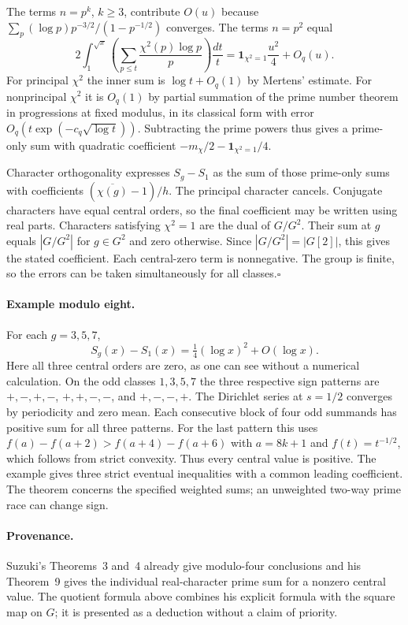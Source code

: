 The terms $n=p^k$, $k\ge3$, contribute $O(u)$ because
$\sum_p (\log p)p^{-3/2}/(1-p^{-1/2})$ converges. The terms $n=p^2$ equal
\[
 2\int_1^{\sqrt x}
        \left(\sum_{p\le t}\frac{\chi^2(p)\log p}{p}\right)\frac{dt}{t}
 =\mathbf 1_{\chi^2=1}\frac{u^2}{4}+O_q(u).
\]
For principal $\chi^2$ the inner sum is $\log t+O_q(1)$ by Mertens'
estimate. For nonprincipal $\chi^2$ it is $O_q(1)$ by partial summation
of the prime number theorem in progressions at fixed modulus, in its
classical form with error $O_q(t\exp(-c_q\sqrt{\log t}))$.
Subtracting the prime powers thus gives a prime-only sum with quadratic
coefficient $-m_\chi/2-\mathbf 1_{\chi^2=1}/4$.

Character orthogonality expresses $S_g-S_1$ as the sum of those
prime-only sums with coefficients $(\overline{\chi(g)}-1)/h$. The principal
character cancels. Conjugate characters have equal central orders, so the
final coefficient may be written using real parts. Characters satisfying
$\chi^2=1$ are the dual of $G/G^2$. Their sum at $g$ equals
$|G/G^2|$ for $g\in G^2$ and zero otherwise. Since
$|G/G^2|=|G[2]|$, this gives the stated coefficient. Each central-zero
term is nonnegative. The group is finite, so the errors can be taken
simultaneously for all classes.\hfill$\square$

\paragraph{Example modulo eight.}
For each $g=3,5,7$,
\[
  S_g(x)-S_1(x)=\tfrac14(\log x)^2+O(\log x).
\]
Here all three central orders are zero, as one can see without a
numerical calculation. On the odd classes $1,3,5,7$ the three respective
sign patterns are $+,-,+,-$, $+,+,-,-$, and $+,-,-,+$.
The Dirichlet series at $s=1/2$ converges by periodicity and zero mean.
Each consecutive block of four odd summands has positive sum for all
three patterns. For the last pattern this uses
$f(a)-f(a+2)>f(a+4)-f(a+6)$ with $a=8k+1$ and
$f(t)=t^{-1/2}$, which follows from strict convexity. Thus every central
value is positive. The example gives three strict eventual inequalities
with a common leading coefficient. The theorem concerns the specified
weighted sums; an unweighted two-way prime race can change sign.

\paragraph{Provenance.}
Suzuki's Theorems~3 and~4 already give modulo-four conclusions and his
Theorem~9 gives the individual real-character prime sum for a nonzero
central value. The quotient formula above combines his explicit formula
with the square map on $G$; it is presented as a deduction without a claim
of priority.
